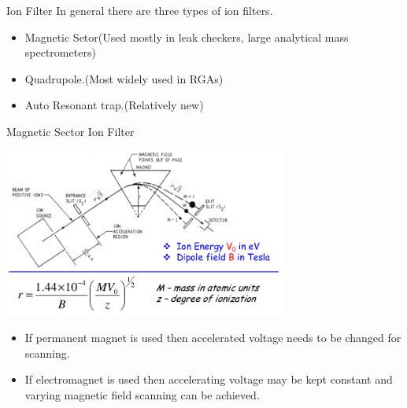 \documentclass[11pt]{beamer}
\begin{document}
\begin{frame}{Ion Filter}
In general there are three types of ion filters.
	\begin{itemize}
		\item Magnetic Setor(Used mostly in leak checkers, large analytical mass spectrometers)
        \item Quadrupole.(Most widely used in RGAs)
        \item Auto Resonant trap.(Relatively new)
		
		\end{itemize}


\end{frame}


\begin{frame}{Magnetic Sector Ion Filter}

   
  \begin{block}{} 
       \begin{center}
			\includegraphics[width=0.7\textwidth]{MagSectIonFilter.png}
		\end{center} 	

\begin{itemize}
 \item If permanent magnet is used then accelerated voltage needs to be changed for scanning.
 \item If electromagnet is used then accelerating voltage may be kept constant and varying magnetic field scanning can be achieved.
\end{itemize}

  \end {block}



\end{frame}
\end{document}

